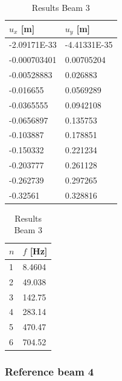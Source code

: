 \begin{table}[H]
\begin{tabular}{ll}
\hline
$u_x$ [m] & $u_y$ [m] \\
\hline
-2.09171E-33 & -4.41331E-35 \\
-0.000703401 & 0.00705204 \\
-0.00528883 & 0.026883 \\
-0.016655 & 0.0569289 \\
-0.0365555 & 0.0942108 \\
-0.0656897 & 0.135753 \\
-0.103887 & 0.178851 \\
-0.150332 & 0.221234 \\
-0.203777 & 0.261128 \\
-0.262739 & 0.297265 \\
-0.32561 & 0.328816 \\
\hline
\end{tabular}
\begin{tabular}{ll}
\hline
$n$ & $f$ [Hz] \\
\hline
1 & 8.4604 \\
2 & 49.038 \\
3 & 142.75 \\
4 & 283.14 \\
5 & 470.47 \\
6 & 704.52 \\
\hline
\end{tabular}
\caption{Results Beam 3}
\end{table}

\newpage
\subsubsection*{Reference beam 4}

